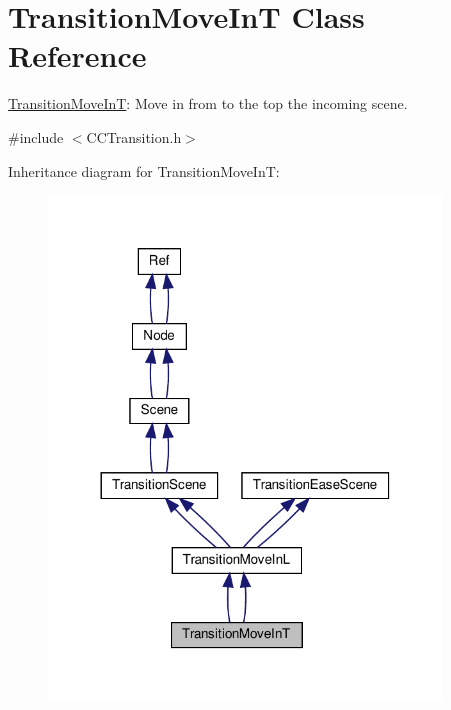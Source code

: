 \hypertarget{classTransitionMoveInT}{}\section{Transition\+Move\+InT Class Reference}
\label{classTransitionMoveInT}


\hyperlink{classTransitionMoveInT}{Transition\+Move\+InT}\+: Move in from to the top the incoming scene.  




{\ttfamily \#include $<$C\+C\+Transition.\+h$>$}



Inheritance diagram for Transition\+Move\+InT\+:
\nopagebreak
\begin{figure}[H]
\begin{center}
\leavevmode
\includegraphics[width=296pt]{classTransitionMoveInT__inherit__graph}
\end{center}
\end{figure}


